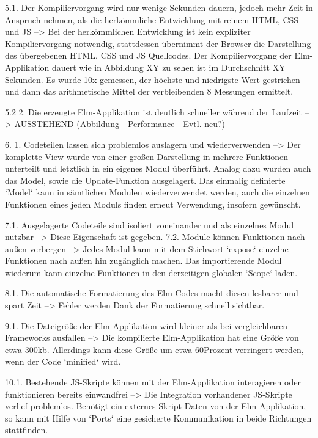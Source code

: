  5.1. Der Kompiliervorgang wird nur wenige Sekunden dauern, jedoch mehr Zeit in Anspruch nehmen, als die herkömmliche Entwicklung mit reinem HTML, CSS und JS
 --> Bei der herkömmlichen Entwicklung ist kein expliziter Kompiliervorgang notwendig, stattdessen übernimmt der Browser die Darstellung des übergebenen HTML, CSS und JS Quellcodes. Der Kompiliervorgang der Elm-Applikation dauert wie in Abbildung XY  zu sehen ist im Durchschnitt XY Sekunden. Es wurde 10x gemessen, der höchste und niedrigste Wert gestrichen und dann das arithmetische Mittel der verbleibenden 8 Messungen ermittelt.
 
 5.2  2. Die erzeugte Elm-Applikation ist deutlich schneller während der Laufzeit
 --> AUSSTEHEND (Abbildung - Performance - Evtl. neu?)
 
 6. 1. Codeteilen lassen sich problemlos auslagern und wiederverwenden
 --> Der komplette View wurde von einer großen Darstellung in mehrere Funktionen unterteilt und letztlich in ein eigenes Modul überführt. Analog dazu wurden auch das Model, sowie die Update-Funktion ausgelagert. Das einmalig definierte `Model` kann in sämtlichen Modulen wiederverwendet werden, auch die einzelnen Funktionen eines jeden Moduls finden erneut Verwendung, insofern gewünscht.
 
 7.1. Ausgelagerte Codeteile sind isoliert voneinander und als einzelnes Modul nutzbar
 --> Diese Eigenschaft ist gegeben.
 7.2. Module können Funktionen nach außen verbergen
 --> Jedes Modul kann mit dem Stichwort `expose` einzelne Funktionen nach außen hin zugänglich machen. Das importierende Modul wiederum kann einzelne Funktionen in den derzeitigen globalen `Scope` laden.
 
 8.1. Die automatische Formatierung des Elm-Codes macht diesen lesbarer und spart Zeit
 --> Fehler werden Dank der Formatierung schnell sichtbar.
 
 9.1. Die Dateigröße der Elm-Applikation wird kleiner als bei vergleichbaren Frameworks ausfallen
 --> Die kompilierte Elm-Applikation hat eine Größe von etwa 300kb. Allerdings kann diese Größe um etwa 60Prozent verringert werden, wenn der Code `minified` wird.
  
  10.1. Bestehende JS-Skripte können mit der Elm-Applikation interagieren oder funktionieren bereits einwandfrei
  --> Die Integration vorhandener JS-Skripte verlief problemlos. Benötigt ein externes Skript Daten von der Elm-Applikation, so kann mit Hilfe von `Ports` eine gesicherte Kommunikation in beide Richtungen stattfinden.
  
